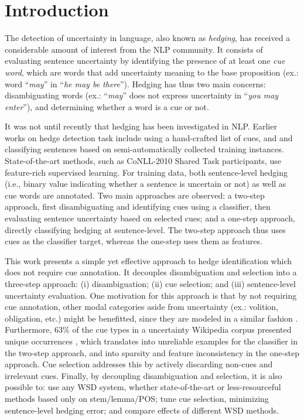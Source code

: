 \documentclass[english]{jnlp_1.4}
\begin{document}
\maketitle


\section{Introduction}

The detection of uncertainty in language, also known as \emph{hedging}, has received a considerable amount of interest from the NLP community. It consists of evaluating sentence uncertainty by identifying the presence of at least one \emph{cue word}, which are words that add uncertainty meaning to the base proposition (ex.: word ``\emph{may}'' in ``\emph{he may be there}''). Hedging has thus two main concerns: disambiguating words (ex.: ``\emph{may}'' does not express uncertainty in ``\emph{you may enter}''), and determining whether a word is a cue or not.

It was not until recently that hedging has been investigated in NLP. Earlier works on hedge detection task include  using a hand-crafted list of cues, and  and  classifying sentences based on semi-automatically collected training instances. State-of-the-art methods, such as CoNLL-2010 Shared Task \cite{farkas10} participants, use feature-rich supervised learning. For training data, both sentence-level hedging (i.e., binary value indicating whether a sentence is uncertain or not) as well as cue words are annotated. Two main approaches are observed: a two-step approach, first disambiguating and identifying cues using a classifier, then evaluating sentence uncertainty based on selected cues; and a one-step approach, directly classifying hedging at sentence-level. The two-step approach thus uses cues as the classifier target, whereas the one-step uses them as features.

This work presents a simple yet effective approach to hedge identification which does not require cue annotation. It decouples disambiguation and selection into a three-step approach: (i) disambiguation; (ii) cue selection; and (iii) sentence-level uncertainty evaluation. One motivation for this approach is that by not requiring cue annotation, other modal categories aside from uncertainty (ex.: volition, obligation, etc.) might be benefitted, since they are modeled in a similar fashion \cite{palmer01,nirenburg08}. Furthermore, 63\% of the cue types in a uncertainty Wikipedia corpus presented unique occurrences \cite{morante10}, which translates into unreliable examples for the classifier in the two-step approach, and into sparsity and feature inconsistency in the one-step approach. Cue selection addresses this by actively discarding non-cues and irrelevant cues. Finally, by decoupling disambiguation and selection, it is also possible to: use any WSD system, whether state-of-the-art or less-resourceful methods based only on stem/lemma/POS; tune cue selection, minimizing sentence-level hedging error; and compare effects of different WSD methods.
\end{document}
